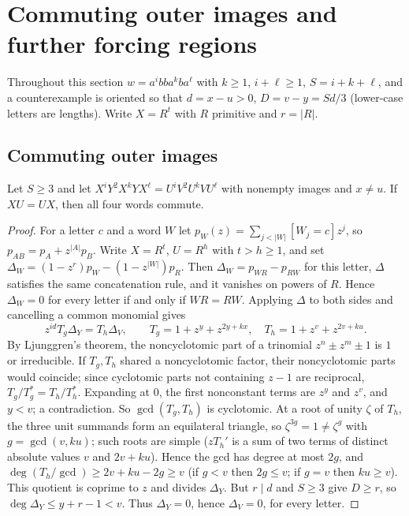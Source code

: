 \section{Commuting outer images and further forcing regions}\label{sec:regions}
Throughout this section \(w=a^ibba^kba^\ell\) with \(k\ge1\), \(i+\ell\ge1\), \(S=i+k+\ell\), and a counterexample is oriented so that \(d=x-u>0\), \(D=v-y=Sd/3\) (lower-case letters are lengths). Write \(X=R^t\) with \(R\) primitive and \(r=|R|\).

\subsection{Commuting outer images}
\begin{lemma}\label{commouter}
Let \(S\ge3\) and let \(X^iY^2X^kYX^\ell=U^iV^2U^kVU^\ell\) with nonempty images and \(x\ne u\). If \(XU=UX\), then all four words commute.
\end{lemma}
\begin{proof}
For a letter \(c\) and a word \(W\) let \(p_W(z)=\sum_{j<|W|}[W_j=c]z^j\), so \(p_{AB}=p_A+z^{|A|}p_B\). Write \(X=R^t\), \(U=R^h\) with \(t>h\ge1\), and set \(\Delta_W=(1-z^r)p_W-(1-z^{|W|})p_R\). Then \(\Delta_W=p_{WR}-p_{RW}\) for this letter, \(\Delta\) satisfies the same concatenation rule, and it vanishes on powers of \(R\). Hence \(\Delta_W=0\) for every letter if and only if \(WR=RW\). Applying \(\Delta\) to both sides and cancelling a common monomial gives
\[
z^{id}T_g\Delta_Y=T_h\Delta_V,\qquad T_g=1+z^y+z^{2y+kx},\quad T_h=1+z^v+z^{2v+ku}.
\]
By Ljunggren's theorem, the noncyclotomic part of a trinomial \(z^n\pm z^m\pm1\) is \(1\) or irreducible. If \(T_g,T_h\) shared a noncyclotomic factor, their noncyclotomic parts would coincide; since cyclotomic parts not containing \(z-1\) are reciprocal, \(T_g/T_g^*=T_h/T_h^*\). Expanding at \(0\), the first nonconstant terms are \(z^y\) and \(z^v\), and \(y<v\); a contradiction. So \(\gcd(T_g,T_h)\) is cyclotomic. At a root of unity \(\zeta\) of \(T_h\), the three unit summands form an equilateral triangle, so \(\zeta^{3g}=1\ne\zeta^g\) with \(g=\gcd(v,ku)\); such roots are simple (\(zT_h'\) is a sum of two terms of distinct absolute values \(v\) and \(2v+ku\)). Hence the gcd has degree at most \(2g\), and \(\deg(T_h/\gcd)\ge 2v+ku-2g\ge v\) (if \(g<v\) then \(2g\le v\); if \(g=v\) then \(ku\ge v\)). This quotient is coprime to \(z\) and divides \(\Delta_Y\). But \(r\mid d\) and \(S\ge3\) give \(D\ge r\), so \(\deg\Delta_Y\le y+r-1<v\). Thus \(\Delta_Y=0\), hence \(\Delta_V=0\), for every letter.
\end{proof}

